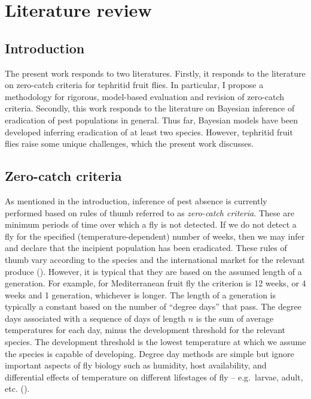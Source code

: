\documentclass[
  oneside]{book}
\begin{document}
\hypertarget{lit-review}{%
\chapter{Literature review}\label{lit-review}}

\hypertarget{introduction-1}{%
\section{Introduction}\label{introduction-1}}

The present work responds to two literatures. Firstly, it responds to the literature on zero-catch criteria for tephritid fruit flies. In particular, I propose a methodology for rigorous, model-based evaluation and revision of zero-catch criteria. Secondly, this work responds to the literature on Bayesian inference of eradication of pest populations in general. Thus far, Bayesian models have been developed inferring eradication of at least two species. However, tephritid fruit flies raise some unique challenges, which the present work discusses.

\hypertarget{zero-catch-criteria}{%
\section{Zero-catch criteria}\label{zero-catch-criteria}}

As mentioned in the introduction, inference of pest absence is currently performed based on rules of thumb referred to as \emph{zero-catch criteria}. These are minimum periods of time over which a fly is not detected. If we do not detect a fly for the specified (temperature-dependent) number of weeks, then we may infer and declare that the incipient population has been eradicated. These rules of thumb vary according to the species and the international market for the relevant produce (\citet{meats2005}). However, it is typical that they are based on the assumed length of a generation. For example, for Mediterranean fruit fly the criterion is 12 weeks, or 4 weeks and 1 generation, whichever is longer. The length of a generation is typically a constant based on the number of ``degree days'' that pass. The degree days associated with a sequence of days of length \(n\) is the sum of average temperatures for each day, minus the development threshold for the relevant species. The development threshold is the lowest temperature at which we assume the species is capable of developing. Degree day methods are simple but ignore important aspects of fly biology such as humidity, host availability, and differential effects of temperature on different lifestages of fly -- e.g.~larvae, adult, etc. (\citet{collier2017}).
\end{document}
